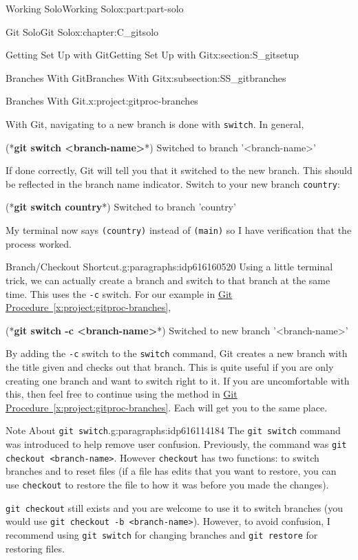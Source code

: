 \documentclass[oneside,10pt,]{book}
\newcommand{\xreffont}{\relax}
\newcommand{\mono}[1]{\texttt{#1}}
\newcommand{\consoleinput}[1]{\textbf{#1}}
\begin{document}
\begin{partptx}{Working Solo}{}{Working Solo}{}{}{x:part:part-solo}
\begin{chapterptx}{Git Solo}{}{Git Solo}{}{}{x:chapter:C_gitsolo}
\begin{sectionptx}{Getting Set Up with Git}{}{Getting Set Up with Git}{}{}{x:section:S_gitsetup}
\begin{subsectionptx}{Branches With Git}{}{Branches With Git}{}{}{x:subsection:SS_gitbranches}
\begin{project}{Branches With Git.}{x:project:gitproc-branches}
\begin{enumerate}[font=\bfseries,label=(\alph*),ref=\alph*]
\par
With Git, navigating to a new branch is done with \mono{switch}. In general,%
\begin{console}{0}{1}{0}
(*\consoleinput{git switch <branch-name>}*)
Switched to branch '<branch-name>'
\end{console}
If done correctly, Git will tell you that it switched to the new branch. This should be reflected in the branch name indicator. Switch to your new branch \mono{country}:%
\begin{console}{0}{1}{0}
(*\consoleinput{git switch country}*)
Switched to branch 'country'
\end{console}
My terminal now says \mono{(country)} instead of \mono{(main)} so I have verification that the process worked.%
\end{enumerate}
\end{project}%
\begin{paragraphs}{Branch\slash{}Checkout Shortcut.}{g:paragraphs:idp616160520}%
Using a little terminal trick, we can actually create a branch and switch to that branch at the same time. This uses the \mono{-c} switch. For our example in \hyperref[x:project:gitproc-branches]{Git Procedure~{\xreffont\ref{x:project:gitproc-branches}}},%
\begin{console}{0}{1}{0}
(*\consoleinput{git switch -c <branch-name>}*)
Switched to new branch '<branch-name>'
\end{console}
By adding the \mono{-c} switch to the \mono{switch} command, Git creates a new branch with the title given and checks out that branch. This is quite useful if you are only creating one branch and want to switch right to it. If you are uncomfortable with this, then feel free to continue using the method in \hyperref[x:project:gitproc-branches]{Git Procedure~{\xreffont\ref{x:project:gitproc-branches}}}. Each will get you to the same place.%
\end{paragraphs}%
\end{subsectionptx}
\begin{paragraphs}{Note About \mono{git switch}.}{g:paragraphs:idp616114184}%
The \mono{git switch} command was introduced to help remove user confusion. Previously, the command was \mono{git checkout <branch-name>}. However \mono{checkout} has two functions: to switch branches and to reset files (if a file has edits that you want to restore, you can use \mono{checkout} to restore the file to how it was before you made the changes).%
\par
\mono{git checkout} still exists and you are welcome to use it to switch branches (you would use \mono{git checkout -b <branch-name>}). However, to avoid confusion, I recommend using \mono{git switch} for changing branches and \mono{git restore} for restoring files.%

\end{paragraphs}
\end{sectionptx}
\end{chapterptx}
\end{partptx}
\end{document}

